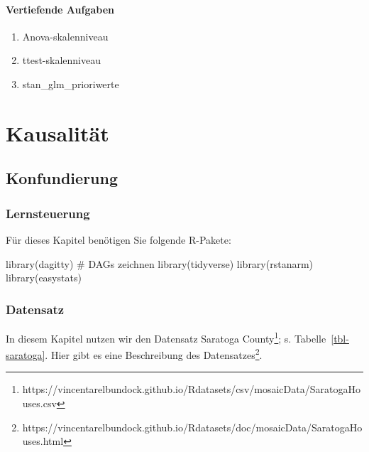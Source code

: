 \documentclass[
  ngerman,
  letterpaper,
  twoside,
  open=any]{scrbook}
\newenvironment{Shaded}{\begin{snugshade}}{\end{snugshade}}
\newcommand{\CommentTok}[1]{\textcolor[rgb]{0.37,0.37,0.37}{#1}}
\newcommand{\FunctionTok}[1]{\textcolor[rgb]{0.28,0.35,0.67}{#1}}
\newcommand{\NormalTok}[1]{\textcolor[rgb]{0.00,0.23,0.31}{#1}}
\providecommand{\tightlist}{%
  \setlength{\itemsep}{0pt}\setlength{\parskip}{0pt}}\usepackage{longtable,booktabs,array}
\theoremstyle{definition}
\theoremstyle{plain}
\theoremstyle{definition}
\theoremstyle{definition}
\theoremstyle{definition}
\theoremstyle{definition}
\theoremstyle{remark}
\begin{document}
\subsection{Vertiefende Aufgaben}\label{vertiefende-aufgaben}

\begin{enumerate}
\def\labelenumi{\arabic{enumi}.}
\tightlist
\item
  Anova-skalenniveau
\item
  ttest-skalenniveau
\item
  stan\_glm\_prioriwerte
\end{enumerate}

\part{Kausalität}

\chapter{Konfundierung}\label{sec-kausal}

\section{Lernsteuerung}\label{lernsteuerung-11}

\providecommand{\indep}{\perp \!\!\! \perp}

Für dieses Kapitel benötigen Sie folgende R-Pakete:

\begin{Shaded}
\begin{Highlighting}[]
\FunctionTok{library}\NormalTok{(dagitty)  }\CommentTok{\# DAGs zeichnen}
\FunctionTok{library}\NormalTok{(tidyverse)}
\FunctionTok{library}\NormalTok{(rstanarm)}
\FunctionTok{library}\NormalTok{(easystats)}
\end{Highlighting}
\end{Shaded}

\section{Datensatz}\label{sec-kausal-daten}

In diesem Kapitel nutzen wir den Datensatz Saratoga County\footnote{https://vincentarelbundock.github.io/Rdatasets/csv/mosaicData/SaratogaHouses.csv};
s. Tabelle~\ref{tbl-saratoga}. Hier gibt es eine Beschreibung des
Datensatzes\footnote{https://vincentarelbundock.github.io/Rdatasets/doc/mosaicData/SaratogaHouses.html}.
\end{document}
